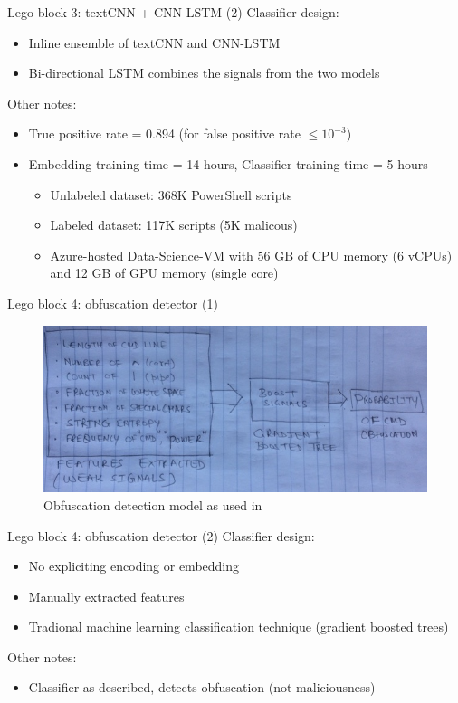 \documentclass[10pt]{beamer}
\begin{document}
\begin{frame}{Lego block 3: textCNN + CNN-LSTM (2)}
	Classifier design:
	\begin{itemize}
		\item Inline ensemble of textCNN and CNN-LSTM
		\item Bi-directional LSTM combines the signals from the two models
	\end{itemize}
	Other notes:
	\begin{itemize}
		\item True positive rate = 0.894 (for false positive rate $\le 10^{-3}$)
		\item Embedding training time = 14 hours, Classifier training time = 5 hours
		\begin{itemize}
			\item Unlabeled dataset: 368K PowerShell scripts
			\item Labeled dataset: 117K scripts (5K malicous)
			\item Azure-hosted Data-Science-VM with 56 GB of CPU memory (6 vCPUs) and 12 GB of GPU memory (single core)
		\end{itemize}
	\end{itemize}
\end{frame}

\begin{frame}{Lego block 4: obfuscation detector (1)}
	\begin{figure}
		\includegraphics[scale=0.50]{gbtree}
		\caption{Obfuscation detection model as used in \cite{feye2018}}
	\end{figure}
\end{frame}

\begin{frame}{Lego block 4: obfuscation detector (2)}
	Classifier design:
	\begin{itemize}
		\item No expliciting encoding or embedding
		\item Manually extracted features
		\item Tradional machine learning classification technique (gradient boosted trees)
	\end{itemize}
	Other notes:
	\begin{itemize}
		\item Classifier as described, detects obfuscation (not maliciousness)
	\end{itemize}
\end{frame}
\end{document}
